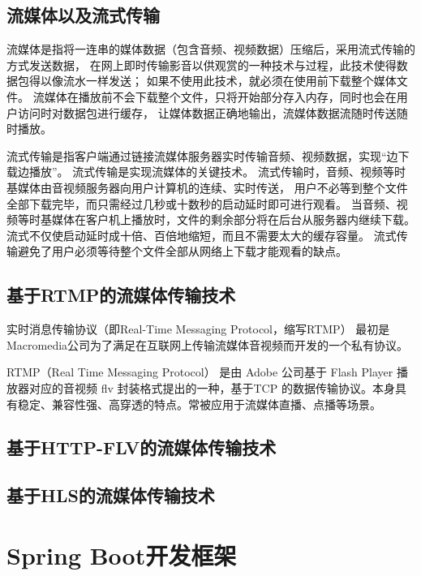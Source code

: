 \subsection{流媒体以及流式传输}
流媒体是指将一连串的媒体数据（包含音频、视频数据）压缩后，采用流式传输的方式发送数据，
在网上即时传输影音以供观赏的一种技术与过程，此技术使得数据包得以像流水一样发送；
如果不使用此技术，就必须在使用前下载整个媒体文件。
流媒体在播放前不会下载整个文件，只将开始部分存入内存，同时也会在用户访问时对数据包进行缓存，
让媒体数据正确地输出，流媒体数据流随时传送随时播放。

流式传输是指客户端通过链接流媒体服务器实时传输音频、视频数据，实现“边下载边播放”。
流式传输是实现流媒体的关键技术。
流式传输时，音频、视频等时基媒体由音视频服务器向用户计算机的连续、实时传送，
用户不必等到整个文件全部下载完毕，而只需经过几秒或十数秒的启动延时即可进行观看。
当音频、视频等时基媒体在客户机上播放时，文件的剩余部分将在后台从服务器内继续下载。
流式不仅使启动延时成十倍、百倍地缩短，而且不需要太大的缓存容量。
流式传输避免了用户必须等待整个文件全部从网络上下载才能观看的缺点。


\subsection{基于RTMP的流媒体传输技术}
实时消息传输协议（即Real-Time Messaging Protocol，缩写RTMP） 最初是Macromedia公司为了满足在互联网上传输流媒体音视频而开发的一个私有协议。

RTMP（Real Time Messaging Protocol） 是由 Adobe 公司基于 Flash Player 播放器对应的音视频 flv 封装格式提出的一种，基于TCP 的数据传输协议。本身具有稳定、兼容性强、高穿透的特点。常被应用于流媒体直播、点播等场景。


\subsection{基于HTTP-FLV的流媒体传输技术}
\subsection{基于HLS的流媒体传输技术}

\section{Spring Boot开发框架}
